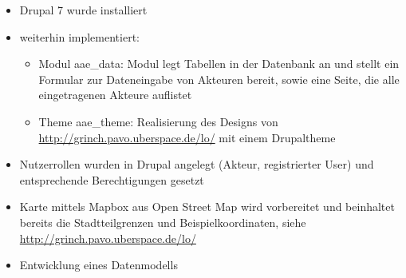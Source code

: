 \documentclass{swp}
\begin{document}
\\\\\\\\\\

\begin{itemize} 
\item Drupal 7 wurde installiert
\item weiterhin implementiert:
\begin{itemize} 
\item Modul \glqq aae\_{}data\grqq{}: Modul legt Tabellen in der Datenbank an und stellt ein Formular zur Dateneingabe von Akteuren bereit, sowie eine Seite, die alle eingetragenen Akteure auflistet
\item Theme \glqq aae\_{}theme\grqq{}: Realisierung des Designs von \url{http://grinch.pavo.uberspace.de/lo/} mit einem Drupaltheme
\end{itemize}
\item Nutzerrollen wurden in Drupal angelegt (Akteur, registrierter User) und entsprechende Berechtigungen gesetzt
\item Karte mittels Mapbox aus Open Street Map wird vorbereitet und beinhaltet bereits die Stadtteilgrenzen und Beispielkoordinaten, siehe \url{http://grinch.pavo.uberspace.de/lo/}
\item Entwicklung eines Datenmodells\\\\
\end{itemize}
\end{document}
